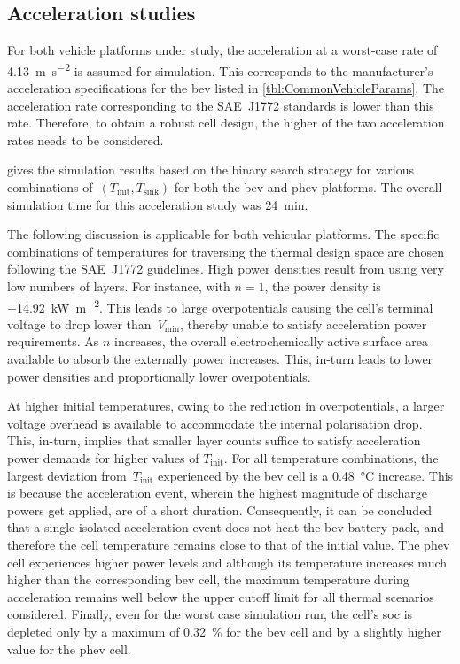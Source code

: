 \subsection{Acceleration studies}

For both vehicle platforms under study, the acceleration at a worst-case rate of
\SI{4.13}{\meter\per\second\squared} is assumed for simulation. This corresponds
to the  manufacturer's acceleration specifications  for the \gls{bev}  listed in
\cref{tbl:CommonVehicleParams}.  The  acceleration  rate  corresponding  to  the
SAE~J1772 standards is lower than this  rate. Therefore, to obtain a robust cell
design, the higher of the two acceleration rates needs to be considered.

  gives the  simulation  results  based on the binary
search strategy for various  combinations of~${(T_\text{init},  T_\text{sink})}$
for  both the  \gls{bev}  and  \gls{phev} platforms. The overall simulation time
for this acceleration study was \SI{24}{\minute}.



The following discussion is applicable for both vehicular platforms. The 
specific combinations  of temperatures  for traversing  the thermal  design
space are  chosen following the  SAE~J1772 guidelines. High  power densities
result from  using very low numbers of layers. For instance, with $n=1$, the
power density is \SI{-14.92}{\kilo\watt\per\meter\squared}. This leads to large
overpotentials  causing the cell's terminal  voltage to  drop lower
than~$V_\text{min}$, thereby  unable to satisfy acceleration power requirements.
As $n$ increases, the overall electrochemically active surface area available to
absorb the externally power increases. This, in-turn leads to lower power
densities and proportionally lower overpotentials.

At higher initial temperatures, owing to the  reduction in  overpotentials, a 
larger  voltage overhead  is available  to accommodate the  internal
polarisation  drop. This, in-turn, implies that smaller layer counts suffice to
satisfy acceleration power demands for higher values of $T_\text{init}$. For all
temperature combinations, the largest deviation from~$T_\text{init}$ 
experienced by the \gls{bev} cell is a \SI{0.48}{\degreeCelsius} increase. This
is because the acceleration event, wherein the highest magnitude of discharge
powers get applied, are of a  short duration. Consequently, it can be  concluded
that a single isolated acceleration event does not heat the \gls{bev} battery
pack, and therefore the cell  temperature remains close to that of  the initial
value. The \gls{phev} cell  experiences higher  power levels  and although  its
temperature increases  much  higher  than  the corresponding  \gls{bev}  cell, 
the  maximum temperature  during acceleration  remains  well below  the  upper
cutoff  limit for all thermal scenarios considered. Finally, even  for the worst
case simulation  run, the cell's  \gls{soc} is depleted only by  a maximum of
\SI{0.32}{\percent} for  the \gls{bev} cell and by a slightly higher value for
the \gls{phev} cell.

